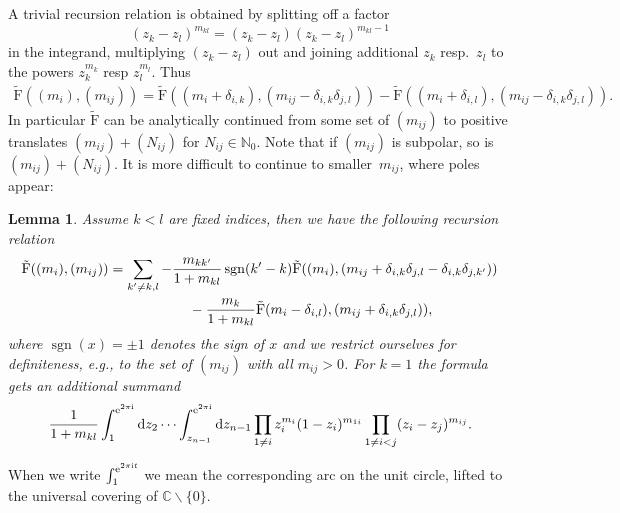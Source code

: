 \documentclass[pdftex]{sigma}%
\numberwithin{equation}{section}
\newtheorem{lem}[teo]{Lemma}
\newcommand{\N}{\mathbb{N}}
\newcommand{\C}{\mathbb{C}}
\renewcommand{\i}{\mathrm{i}}
\renewcommand{\d}{\mathrm{d}}
\newcommand{\rFp}{\tilde{\mathrm{F}}}
\begin{document}
A trivial recursion relation is obtained by splitting off a factor
\[
(z_k-z_l)^{m_{kl}}=(z_k-z_l)(z_k-z_l)^{m_{kl}-1}
\] in the integrand, multiplying $(z_k-z_l)$ out and joining additional $z_k$ resp.~$z_l$ to the powers $z_k^{m_k}$ resp $z_l^{m_l}$. Thus
\begin{gather*}
	\rFp((m_i),(m_{ij}))
	=\rFp((m_i+\delta_{i,k}),(m_{ij}-\delta_{i,k}\delta_{j,l}))
	-\rFp((m_i+\delta_{i,l}),(m_{ij}-\delta_{i,k}\delta_{j,l})).
\end{gather*}
In particular $\rFp$ can be analytically continued from some set of $(m_{ij})$ to positive translates $(m_{ij})+(N_{ij})$ for $N_{ij}\in\N_0$. Note that if $(m_{ij})$ is subpolar, so is $(m_{ij})+(N_{ij})$. It is more difficult to continue to smaller~$m_{ij}$, where poles appear:

\begin{lem}\label{lm_recursion}Assume $k<l$ are fixed indices, then we have the following
recursion relation
\begin{gather*}\rFp((m_i),(m_{ij})) =\sum_{k'\neq k,l} -\frac{m_{kk'}}{1+m_{kl}}\operatorname{sgn}(k'-k) \rFp((m_i),(m_{ij}+\delta_{i,k}\delta_{j,l}-\delta_{i,k}\delta_{j,k'}))\\
\hphantom{\rFp((m_i),(m_{ij})) =}{}
-\frac{m_{k}}{1+m_{kl}} \rFp(m_i-\delta_{i,l}),(m_{ij}+\delta_{i,k}\delta_{j,l})),
 \end{gather*}
where $\operatorname{sgn}(x)=\pm1$ denotes the sign of $x$ and we
restrict ourselves for definiteness, e.g., to the set of $(m_{ij})$ with
all $m_{ij}>0$. For $k=1$ the formula gets an additional summand
\[
\frac{1}{1+m_{kl}}\int_1^{{\rm e}^{2\pi\i }}\d z_2\cdots
\int_{z_{n-1}}^{{\rm e}^{2\pi\i }}\d z_{n-1} \prod_{1\neq i}
z_i^{m_i}(1-z_i)^{m_{1i}}\prod_{1\neq i<j}(z_i - z_j)^{m_{ij}}.
\]
\end{lem}

When we write $\int_{1}^{{\rm e}^{2\pi\i t}}$ we mean the
corresponding arc on the unit circle, lifted to the universal covering
of $\C\backslash\{0\}$.
\end{document}
